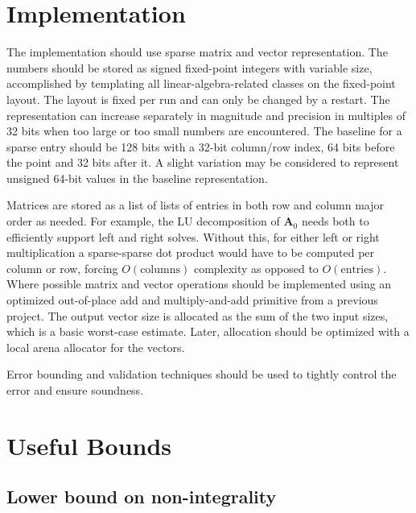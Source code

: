 \documentclass[a4paper, 12pt]{article}
\begin{document}
\section{Implementation}

The implementation should use sparse matrix and vector representation. The numbers should be stored as signed fixed-point integers with variable size, accomplished by templating all linear-algebra-related classes on the fixed-point layout. The layout is fixed per run and can only be changed by a restart. The representation can increase separately in magnitude and precision in multiples of 32 bits when too large or too small numbers are encountered. The baseline for a sparse entry should be 128 bits with a 32-bit column/row index, 64 bits before the point and 32 bits after it. A slight variation may be considered to represent unsigned 64-bit values in the baseline representation.

Matrices are stored as a list of lists of entries in both row and column major order as needed. For example, the LU decomposition of $\bm{A}_0$ needs both to efficiently support left and right solves. Without this, for either left or right multiplication a sparse-sparse dot product would have to be computed per column or row, forcing $O(\text{columns})$ complexity as opposed to $O(\text{entries})$. Where possible matrix and vector operations should be implemented using an optimized out-of-place add and multiply-and-add primitive from a previous project. The output vector size is allocated as the sum of the two input sizes, which is a basic worst-case estimate. Later, allocation should be optimized with a local arena allocator for the vectors.

Error bounding and validation techniques should be used to tightly control the error and ensure soundness.

\section{Useful Bounds}

\subsection{Lower bound on non-integrality}
\end{document}
